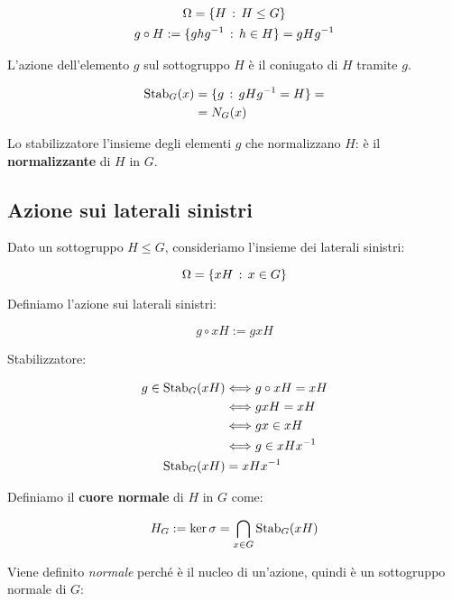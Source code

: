 \begin{gather}
	\Omega = \{ H \,:\, H \le G \} \\
	g \circ H := \{ghg^{-1} \,:\, h \in H\} = gHg^{-1}
\end{gather}

L'azione dell'elemento $g$ sul sottogruppo $H$ è il coniugato di $H$ tramite $g$.

\begin{align}
	\operatorname{Stab}_G(x) &= \{g \,:\, gHg^{-1} = H \} = \\\
	&= N_G(x)
\end{align}

Lo stabilizzatore l'insieme degli elementi $g$ che normalizzano $H$: è il \textbf{normalizzante} di $H$ in $G$.

\subsection{Azione sui laterali sinistri}

Dato un sottogruppo $H \le G$, consideriamo l'insieme dei laterali sinistri:

\begin{equation}
	\Omega = \{ xH \,:\, x \in G \}
\end{equation}
	
Definiamo l'azione sui laterali sinistri:

\begin{equation}
	g \circ xH := gxH
\end{equation}

Stabilizzatore:

\begin{align}
	g \in \operatorname{Stab}_G(xH) &\Longleftrightarrow g \circ xH = xH \\
	&\Longleftrightarrow gxH = xH \\
	&\Longleftrightarrow gx \in xH \\
	&\Longleftrightarrow g \in xHx^{-1} \\
	\operatorname{Stab}_G(xH) &= xHx^{-1}
\end{align}

Definiamo il \textbf{cuore normale} di $H$ in $G$ come:

\begin{equation}
	H_G := \ker \sigma = \bigcap_{x \in G} \operatorname{Stab}_G(xH)
\end{equation}

Viene definito \emph{normale} perché è il nucleo di un'azione, quindi è un sottogruppo normale di $G$:

